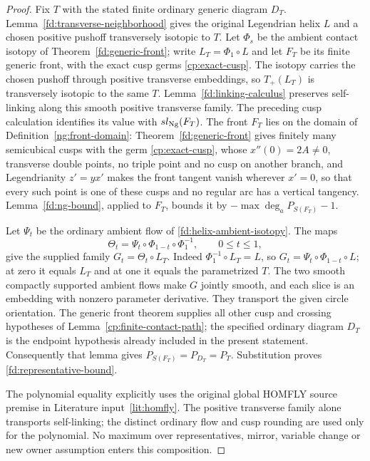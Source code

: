 \begin{proof}
Fix $T$ with the stated finite ordinary generic diagram $D_T$.
Lemma~\ref{fd:transverse-neighborhood} gives the original Legendrian
helix $L$ and a chosen positive pushoff transversely isotopic to $T$.
Let $\Phi_s$ be the ambient contact isotopy of
Theorem~\ref{fd:generic-front}; write $L_T=\Phi_1\circ L$ and let
$F_T$ be its finite generic front, with the exact cusp germs
\eqref{cp:exact-cusp}. The isotopy carries the chosen pushoff through
positive transverse embeddings, so $T_+(L_T)$ is transversely isotopic
to the same $T$. Lemma~\ref{fd:linking-calculus} preserves self-linking
along this smooth positive transverse family. The preceding cusp
calculation identifies its value with $sl_{\rm Ng}(F_T)$. The front
$F_T$ lies on the domain of Definition~\ref{ng:front-domain}:
Theorem~\ref{fd:generic-front} gives finitely many semicubical cusps with
the germ \eqref{cp:exact-cusp}, whose $x''(0)=2A\neq0$, transverse double
points, no triple point and no cusp on another branch, and Legendrianity
$z'=yx'$ makes the front tangent vanish wherever $x'=0$, so that every such
point is one of these cusps and no regular arc has a vertical tangency.
Lemma~\ref{fd:ng-bound}, applied to $F_T$, bounds it by
$-\max\deg_a P_{S(F_T)}-1$.

Let $\Psi_t$ be the ordinary ambient flow of
\eqref{fd:helix-ambient-isotopy}. The maps
\begin{equation}\label{fd:contact-ambient-composition}
 \Theta_t=\Psi_t\circ\Phi_{1-t}\circ\Phi_1^{-1},
 \qquad 0\leq t\leq1,
\end{equation}
give the supplied family $G_t=\Theta_t\circ L_T$.
Indeed $\Phi_1^{-1}\circ L_T=L$, so
$G_t=\Psi_t\circ\Phi_{1-t}\circ L$; at zero it equals $L_T$ and
at one it equals the parametrized $T$. The two smooth compactly
supported ambient flows make $G$ jointly smooth, and each slice is an
embedding with nonzero parameter derivative. They transport the given
circle orientation. The generic front theorem supplies all other cusp
and crossing hypotheses of Lemma~\ref{cp:finite-contact-path}; the
specified ordinary diagram $D_T$ is the endpoint hypothesis already
included in the present statement. Consequently that lemma gives
$P_{S(F_T)}=P_{D_T}=P_T$. Substitution proves
\eqref{fd:representative-bound}.

The polynomial equality explicitly uses the original global
HOMFLY source premise in Literature input~\ref{lit:homfly}. The positive transverse family alone
transports self-linking; the distinct ordinary flow and cusp rounding
are used only for the polynomial. No maximum over representatives,
mirror, variable change or new owner assumption enters this composition.
\end{proof}

